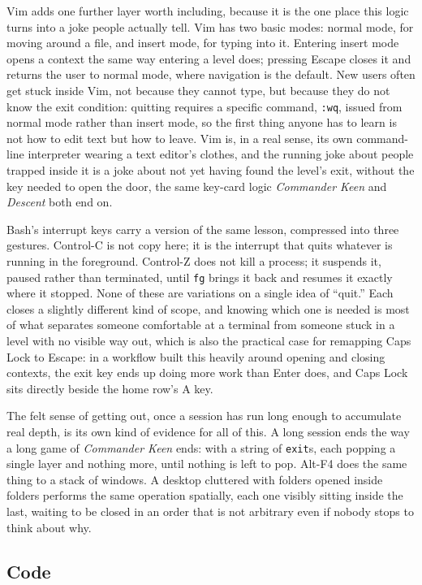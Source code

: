 \documentclass[11pt]{article}
\begin{document}
Vim adds one further layer worth including, because it is the one place this logic turns into a joke people actually tell. Vim has two basic modes: normal mode, for moving around a file, and insert mode, for typing into it. Entering insert mode opens a context the same way entering a level does; pressing Escape closes it and returns the user to normal mode, where navigation is the default. New users often get stuck inside Vim, not because they cannot type, but because they do not know the exit condition: quitting requires a specific command, \texttt{:wq}, issued from normal mode rather than insert mode, so the first thing anyone has to learn is not how to edit text but how to leave. Vim is, in a real sense, its own command-line interpreter wearing a text editor's clothes, and the running joke about people trapped inside it is a joke about not yet having found the level's exit, without the key needed to open the door, the same key-card logic \emph{Commander Keen} and \emph{Descent} both end on.

Bash's interrupt keys carry a version of the same lesson, compressed into three gestures. Control-C is not copy here; it is the interrupt that quits whatever is running in the foreground. Control-Z does not kill a process; it suspends it, paused rather than terminated, until \texttt{fg} brings it back and resumes it exactly where it stopped. None of these are variations on a single idea of ``quit.'' Each closes a slightly different kind of scope, and knowing which one is needed is most of what separates someone comfortable at a terminal from someone stuck in a level with no visible way out, which is also the practical case for remapping Caps Lock to Escape: in a workflow built this heavily around opening and closing contexts, the exit key ends up doing more work than Enter does, and Caps Lock sits directly beside the home row's A key.

The felt sense of getting out, once a session has run long enough to accumulate real depth, is its own kind of evidence for all of this. A long session ends the way a long game of \emph{Commander Keen} ends: with a string of \texttt{exit}s, each popping a single layer and nothing more, until nothing is left to pop. Alt-F4 does the same thing to a stack of windows. A desktop cluttered with folders opened inside folders performs the same operation spatially, each one visibly sitting inside the last, waiting to be closed in an order that is not arbitrary even if nobody stops to think about why.

\subsection{Code}
\end{document}
